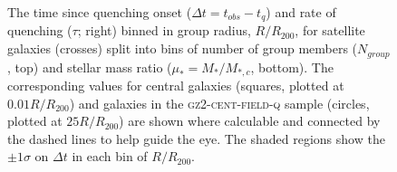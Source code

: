 \begin{figure}
{\caption[Trend of $\Delta t$ and $\tau$ with group radius split by number in group and stellar mass ratio]{The time since quenching onset ($\Delta t = t_{obs} - t_{q}$) and rate of quenching ($\tau$; right) binned in group radius, $R/R_{200}$, for satellite galaxies (crosses) split into bins of number of group members ($N_{group}$, top) and stellar mass ratio ($\mu_* = M_*/M_{*,c}$, bottom). The corresponding values for central galaxies (squares, plotted at $0.01 R/R_{200}$) and galaxies in the \textsc{gz2-cent-field-q} sample (circles, plotted at $25 R/R_{200}$) are shown where calculable and connected by the dashed lines to help guide the eye. The shaded regions show the $\pm1\sigma$ on $\Delta t$ in each bin of $R/R_{200}$.}
\label{fig:timesinceradiusmu}}
\end{figure}

\begin{figure}
\end{figure}

